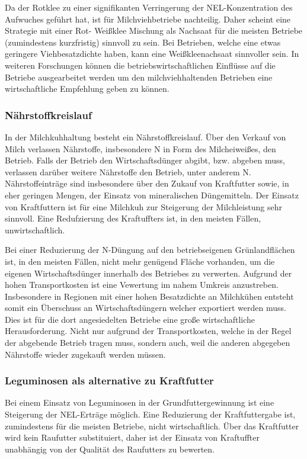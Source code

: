 Da der Rotklee zu einer signifikanten Verringerung der \ac{NEL}-Konzentration des Aufwuches geführt hat, ist für Milchviehbetriebe nachteilig.
Daher scheint eine Strategie mit einer Rot- Weißklee Mischung als Nachsaat für die meisten Betriebe (zumindestens kurzfristig) sinnvoll zu sein.
Bei Betrieben, welche eine etwas geringere Viehbesatzdichte haben, kann eine Weißkleenachsaat sinnvoller sein.
In weiteren Forschungen können die betriebswirtschaftlichen Einflüsse auf die Betriebe ausgearbeitet werden um den milchviehhaltenden Betrieben eine wirtschaftliche Empfehlung geben zu können.

\subsubsection{Nährstoffkreislauf}
\label{subsub:nährstoffkreislauf}

In der Milchkuhhaltung besteht ein Nährstoffkreislauf.
Über den Verkauf von Milch verlassen Nährstoffe, insbesondere N in Form des Milcheiweißes, den Betrieb.
Falls der Betrieb den Wirtschaftsdünger abgibt, bzw. abgeben muss, verlassen darüber weitere Nährstoffe den Betrieb, unter anderem N.
Nährstoffeinträge sind insbesondere über den Zukauf von Kraftfutter sowie, in eher geringen Mengen, der Einsatz von mineralischen Düngemitteln.
Der Einsatz von Kraftfuttern ist für eine Milchkuh zur Steigerung der Milchleistung sehr sinnvoll.
Eine Redufzierung des Kraftuffters ist, in den meisten Fällen, unwirtschaftlich.

Bei einer Reduzierung der N-Düngung auf den betriebseigenen Grünlandflächen ist, in den meisten Fällen, nicht mehr genügend Fläche vorhanden, um die eigenen Wirtschaftsdünger innerhalb des Betriebes zu verwerten.
Aufgrund der hohen Transportkosten ist eine Vewertung im nahem Umkreis anzustreben.
Insbesondere in Regionen mit einer hohen Besatzdichte an Milchkühen entsteht somit ein Überschuss an Wirtschaftsdüngern welcher exportiert werden muss.
Dies ist für die dort angesiedelten Betriebe eine große wirtschaftliche Herausforderung.
Nicht nur aufgrund der Transportkosten, welche in der Regel der abgebende Betrieb tragen muss, sondern auch, weil die anderen abgegeben Nährstoffe wieder zugekauft werden müssen.

\subsubsection{Leguminosen als alternative zu Kraftfutter}
\label{subsub:alternative}
Bei einem Einsatz von Leguminosen in der Grundfuttergewinnung ist eine Steigerung der \ac{NEL}-Erträge möglich.
Eine Reduzierung der Kraftfuttergabe ist, zumindestens für die meisten Betriebe, nicht wirtschaftlich.
Über das Kraftfutter wird kein Raufutter substituiert, daher ist der Einsatz von Kraftuffter unabhängig von der Qualität des Raufutters zu bewerten.

